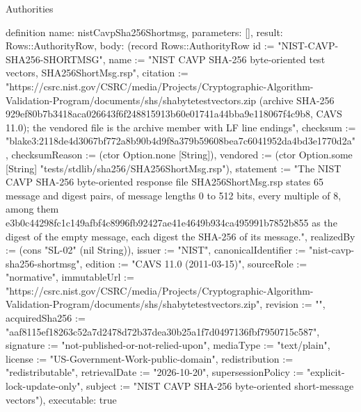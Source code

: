 \begin{lexlean}{Authorities}
\begin{semanticmodule}
definition{
  name: nistCavpSha256Shortmsg,
  parameters: [],
  result: Rows::AuthorityRow,
  body: (record Rows::AuthorityRow {id := "NIST-CAVP-SHA256-SHORTMSG", name := "NIST CAVP SHA-256 byte-oriented test vectors, SHA256ShortMsg.rsp", citation := "https://csrc.nist.gov/CSRC/media/Projects/Cryptographic-Algorithm-Validation-Program/documents/shs/shabytetestvectors.zip (archive SHA-256 929ef80b7b3418aca026643f6f248815913b60e01741a44bba9e118067f4c9b8, CAVS 11.0); the vendored file is the archive member with LF line endings", checksum := "blake3:2118de4d3067bf772a8b90b4d9f8a379b59608bea7c6041952da4bd3e1770d2a", checksumReason := (ctor Option.none [String]), vendored := (ctor Option.some [String] "tests/stdlib/sha256/SHA256ShortMsg.rsp"), statement := "The NIST CAVP SHA-256 byte-oriented response file SHA256ShortMsg.rsp states 65 message and digest pairs, of message lengths 0 to 512 bits, every multiple of 8, among them e3b0c44298fc1c149afbf4c8996fb92427ae41e4649b934ca495991b7852b855 as the digest of the empty message, each digest the SHA-256 of its message.", realizedBy := (cons "SL-02" (nil String)), issuer := "NIST", canonicalIdentifier := "nist-cavp-sha256-shortmsg", edition := "CAVS 11.0 (2011-03-15)", sourceRole := "normative", immutableUrl := "https://csrc.nist.gov/CSRC/media/Projects/Cryptographic-Algorithm-Validation-Program/documents/shs/shabytetestvectors.zip", revision := "", acquiredSha256 := "aaf8115ef18263c52a7d2478d72b37dea30b25a1f7d0497136fbf7950715c587", signature := "not-published-or-not-relied-upon", mediaType := "text/plain", license := "US-Government-Work-public-domain", redistribution := "redistributable", retrievalDate := "2026-10-20", supersessionPolicy := "explicit-lock-update-only", subject := "NIST CAVP SHA-256 byte-oriented short-message vectors"}),
  executable: true
}


\end{semanticmodule}
\end{lexlean}
